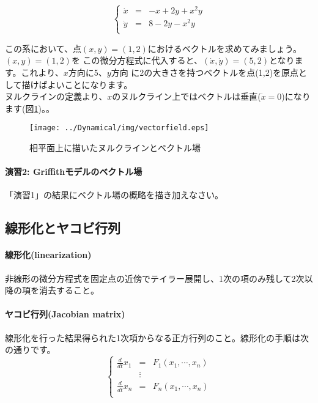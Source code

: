\[
\left\{
\begin{array}{lclclll}
\dot x & = & -x + 2y + x^2y\\
\dot y & = & 8 -2y -x^2y\\
\end{array}
\right.\]

この系において、点\((x,y)=(1,2)\)におけるベクトルを求めてみましょう。\((x,y)=(1,2)\)を
この微分方程式に代入すると、\((\dot x, \dot y)=(5,2)\)となります。これより、\(x\)方向に5、\(y\)方向
に2の大きさを持つベクトルを点(1,2)を原点として描けばよいことになります。\\

\indent ヌルクラインの定義より、\(x\)のヌルクライン上ではベクトルは垂直(\(\dot x = 0\))になります(図\ref{fig:05sysbio})。。

\begin{figure}[ht]
        \centering \texttt{[image: ../Dynamical/img/vectorfield.eps]}
        \caption{相平面上に描いたヌルクラインとベクトル場}
        \label{fig:05sysbio} \end{figure}


\paragraph{演習2:  Griffithモデルのベクトル場}
「演習1」の結果にベクトル場の概略を描き加えなさい。


\subsection{線形化とヤコビ行列}
\paragraph{線形化(linearization)}
非線形の微分方程式を固定点の近傍でテイラー展開し、1次の項のみ残して2次以降の項を消去すること。

\paragraph{ヤコビ行列(Jacobian matrix)}
線形化を行った結果得られた1次項からなる正方行列のこと。線形化の手順は次の通りです。
\[
\left\{
\begin{array}{lclclll}
\displaystyle\frac{d}{dt}x_1 & = & F_1(x_1, \cdots , x_n)\\
                & \vdots & \\
\displaystyle\frac{d}{dt}x_n & = & F_n(x_1, \cdots , x_n)\\
\end{array}
\right.
\]

